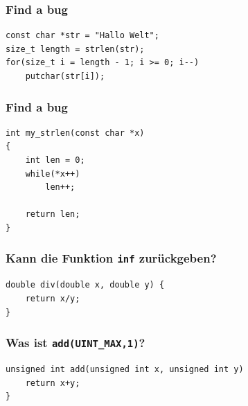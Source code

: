 \documentclass[12pt,compress]{beamer}
\begin{document}
\begin{frame}[fragile]
\frametitle{Find a bug}
\begin{lstlisting}
const char *str = "Hallo Welt";
size_t length = strlen(str);
for(size_t i = length - 1; i >= 0; i--)
    putchar(str[i]);
\end{lstlisting}
\end{frame}

\begin{frame}[fragile]
\frametitle{Find a bug}
\begin{lstlisting}
int my_strlen(const char *x)
{
    int len = 0;
    while(*x++)
        len++;

    return len;
}
\end{lstlisting}
\end{frame}

\begin{frame}[fragile]
\frametitle{Kann die Funktion \texttt{inf} zurückgeben?}
\begin{lstlisting}
double div(double x, double y) {
    return x/y;
}
\end{lstlisting}
\end{frame}

\begin{frame}[fragile]
\frametitle{Was ist \texttt{add(UINT\_MAX,1)}?}
\begin{lstlisting}
unsigned int add(unsigned int x, unsigned int y)
    return x+y;
}
\end{lstlisting}
\end{frame}
\end{document}
